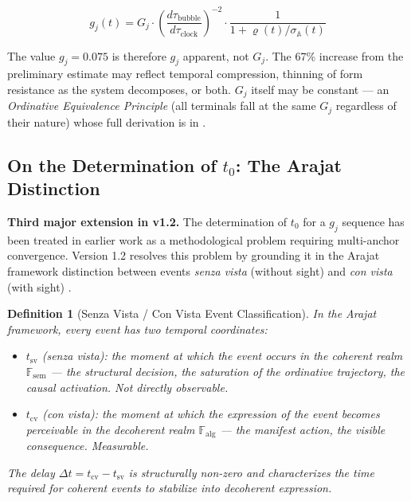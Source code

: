 \documentclass[12pt,a4paper]{article}
\newtheorem{definition}{Definition}[section]
\newcommand{\gj}{g_j}
\newcommand{\Fsem}{\mathbb{F}_{\mathrm{sem}}}
\newcommand{\Falg}{\mathbb{F}_{\mathrm{alg}}}
\begin{document}
\begin{equation}\label{eq:gj_apparent_full}
\gj(t) = G_j \cdot \left(\frac{d\tau_{\mathrm{bubble}}}{d\tau_{\mathrm{clock}}}\right)^{-2} \cdot \frac{1}{1 + \varrho(t)/\sigma_{\mathbb{A}}(t)}
\end{equation}

The value $\gj = 0.075$ is therefore $\gj$ apparent, not $G_j$. The 67\% increase from the preliminary estimate may reflect temporal compression, thinning of form resistance as the system decomposes, or both. $G_j$ itself may be constant --- an \emph{Ordinative Equivalence Principle} (all terminals fall at the same $G_j$ regardless of their nature) whose full derivation is in \cite{ghioni2026direction}.

\subsection{On the Determination of $t_0$: The Arajat Distinction}\label{subsec:arajat_t0}

\textbf{Third major extension in v1.2.} The determination of $t_0$ for a $\gj$ sequence has been treated in earlier work as a methodological problem requiring multi-anchor convergence. Version 1.2 resolves this problem by grounding it in the Arajat framework distinction between events \emph{senza vista} (without sight) and \emph{con vista} (with sight) \cite{arajat_codex}.

\begin{definition}[Senza Vista / Con Vista Event Classification]\label{def:senza_vista}
In the Arajat framework, every event has two temporal coordinates:
\begin{itemize}[leftmargin=2em]
    \item $t_{\mathrm{sv}}$ (\emph{senza vista}): the moment at which the event occurs in the coherent realm $\Fsem$ --- the structural decision, the saturation of the ordinative trajectory, the causal activation. Not directly observable.
    \item $t_{\mathrm{cv}}$ (\emph{con vista}): the moment at which the expression of the event becomes perceivable in the decoherent realm $\Falg$ --- the manifest action, the visible consequence. Measurable.
\end{itemize}
The delay $\Delta t = t_{\mathrm{cv}} - t_{\mathrm{sv}}$ is structurally non-zero and characterizes the time required for coherent events to stabilize into decoherent expression.
\end{definition}
\end{document}
